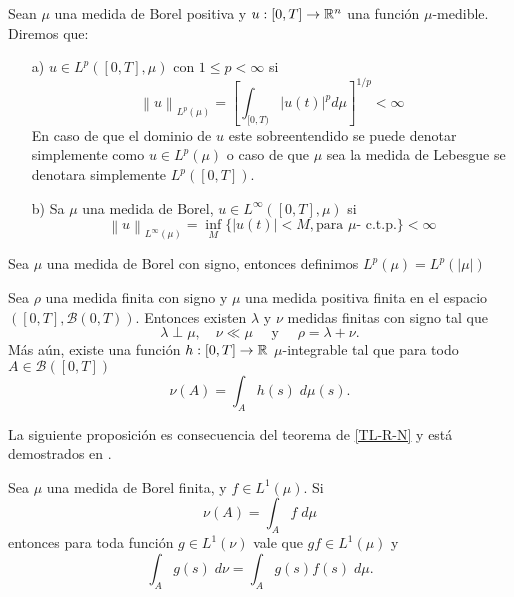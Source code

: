 \begin{defi} 
	Sean $\mu$ una medida de Borel positiva y  $u:[0,T]\to \mathbb{R}^n$ una función $\mu$-medible. Diremos que:
	\begin{enumerate}
		\item [a)] $u\in L^p([0,T],\mu)$   con $1\leq p<\infty$ si 
		 $$\left\| u\right\|_{L^p(\mu)} =\left[ \int_{[0,T)}|u(t)|^p d\mu\right] ^{1/p}<\infty$$
		En caso de que el dominio de $u$ este sobreentendido se puede denotar simplemente como $u\in L^p(\mu)$ o caso de que $\mu$ sea la medida de Lebesgue se denotara simplemente $L^p([0,T])$.
		\item [b)] Sa $\mu$ una medida de Borel, $u\in L^\infty([0,T],\mu)$ si 
		$$\left\| u\right\|_{L^\infty(\mu)}=\inf_{M}\{|u(t)|<M, \text{para } \mu \text{- c.t.p.}\}  <\infty$$
		
	\end{enumerate}
\end{defi}
\begin{defi}
	Sea $\mu$ una medida de Borel con signo, entonces definimos $L^p(\mu)=L^p(|\mu|)$
\end{defi}




\begin{thm}\label{TL-R-N}
	Sea $\rho$ una medida finita con signo y $\mu$ una medida positiva finita en el espacio $\left( [0,T], \mathscr{B}({0,T})\right) $. Entonces existen $\lambda$ y $\nu$ medidas finitas con signo tal que 
	\begin{equation*}
		\lambda\perp\mu, \quad \nu\ll\mu  \quad \text{ y }\quad \rho=\lambda+\nu.
	\end{equation*}
Más aún, existe una función $h:[0,T]\to\mathbb{R}$ $\mu$-integrable tal que para todo $A\in \mathscr{B}([0,T])$
\begin{equation*}
	\nu(A)=\int_A h(s)\;d\mu(s).
\end{equation*}
\end{thm}
La siguiente proposición es consecuencia del teorema de \ref{TL-R-N} y está demostrados en \cite[Proposición 3.9]{folland}.
\begin{prop}
    \label{ob1}
	Sea $\mu$ una medida de Borel finita, y $f\in L^1(\mu)$. Si   $$\nu(A)=\int_A f\; d\mu$$ entonces para toda función $g\in L^1(\nu)$ vale que $gf\in L^1(\mu)$ y 
	\begin{equation*}
	    \int_A g(s)\;d\nu=\int_Ag(s)f(s)\;d\mu.
	\end{equation*}

\end{prop}



